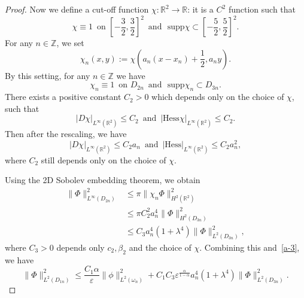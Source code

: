 \documentclass{amsart}
\newcommand\R{\ensuremath{\mathbb{R}}}
\newcommand\Z{\ensuremath{\mathbb{Z}}}
\theoremstyle{definition}
\begin{document}
\begin{proof}
	Now we define a cut-off function $\chi:\R^2\to \R$: it is a $C^2$ function such that
	\begin{equation}
		\chi\equiv 1 \,\text{ on } \left[ -\frac{3}{2},\frac{3}{2} \right] ^2 \, \text{ and } \,\,\mathrm{supp}\chi \subset \left[ -\frac{5}{2},\frac{5}{2} \right] ^2.
	\end{equation}
	For any $n \in \Z$, we set
	\begin{equation}
		\chi_{n}(x,y):=\chi\left(a_n (x-x_n)+\frac{1}{2}, a_n y\right). 
	\end{equation}
	By this setting, for any $n\in \Z$ we have
	\begin{equation}
		\chi_{n}\equiv 1 \, \text{ on } D_{2n} \,\text{ and } \,\,\mathrm{supp}\chi_n \subset D_{3n}.
	\end{equation}
	There exists a positive constant $C_2>0$ which depends only on the choice of $\chi$, such that
	 \begin{equation}
		|D\chi|_{L^{\infty}(\R^2)}\le C_2 \,\text{ and }\,|\mathrm{Hess}\chi|_{L^{\infty}(\R^2)}\le C_2.
	\end{equation}
	Then after the rescaling, we have
	\begin{equation}
		|D\chi|_{L^{\infty}(\R^2)}\le C_2 a_n \,\text{ and }\, |\mathrm{Hess}|_{L^{\infty}(\R^2)}\le C_2a_n^2, 
	\end{equation}
	where $C_2$ still depends only on the choice of  $\chi$.

	Using the 2D Sobolev embedding theorem, we obtain
	\begin{align}
		\|\Phi\|^2_{L^{\infty}(D_{2n})}&\le \pi \|\chi_n \Phi\|^2_{H^2(\R^2)}\\
					     &\le \pi C_2^2  a_n^4 \|\Phi\|^2_{H^2(D_{3n})}\\
					     &\le C_3 a_n^4(1+\lambda^{4})\|\Phi\|^2_{L^2(D_{3n})},
	\end{align}
	where $C_3>0$ depends only $c_2,\beta_2$ and the choice of $\chi$.
	Combining this and~\eqref{a-3}, we have
	\begin{equation}
		\|\Phi\|^2_{L^2(D_{1n})}\le \frac{C_1\alpha}{\varepsilon }\|\phi\|^2_{L^2(\omega_n)}+C_1C_3\varepsilon ^{\frac{\alpha}{1-\alpha}}a_n^{4}(1+\lambda^{4})\|\Phi\|^2_{L^2(D_{3n})}. 	\label{a-4} 
	\end{equation}
	

\end{proof}
\end{document}
